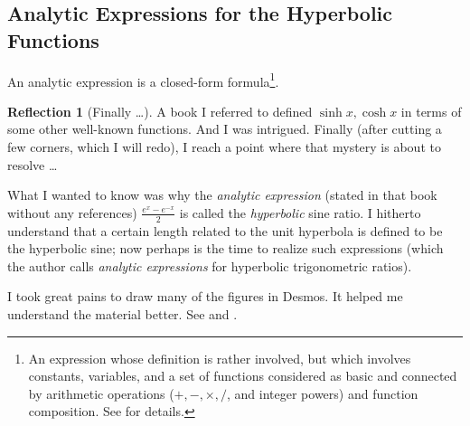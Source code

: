 \documentclass[11pt]{article}
\theoremstyle{definition}
\theoremstyle{plain}
\theoremstyle{problemstyle}
\theoremstyle{remark}
\theoremstyle{definition}
\newtheorem{reflection}{Reflection}
\begin{document}
\subsection{Analytic Expressions for the Hyperbolic Functions}

An analytic expression is a closed-form formula\footnote{An expression whose definition is rather involved, but which involves constants, variables, and a set of functions considered as basic and connected by arithmetic operations ($+,-,\times,/$, and integer powers) and function composition. See \cite{analytic-expr} for details.}.

\begin{reflection}[Finally \dots]
    A book I referred to defined $\sinh x,\cosh x$ in terms of some other well-known functions. And I was intrigued. Finally (after cutting a few corners, which I will redo), I reach a point where that mystery is about to resolve \dots

    What I wanted to know was why the \emph{analytic expression} (stated in that book without any references) $\frac{e^x-e^{-x}}{2}$ is called the \emph{hyperbolic} sine ratio. I hitherto understand that a certain length related to the unit hyperbola is defined to be the hyperbolic sine; now perhaps is the time to realize such expressions (which the author calls \emph{analytic expressions} for hyperbolic trigonometric ratios). 

    I took great pains to draw many of the figures in Desmos. It helped me understand the material better. See \cite{desmos-hyperbolic-distances} and \cite{desmos-hyperbolic-regions}.
\end{reflection}
\end{document}
